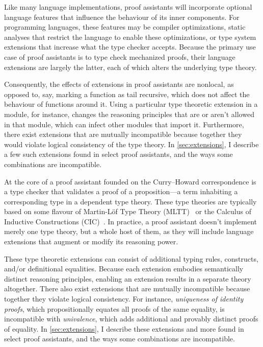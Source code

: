 \documentclass{article}
\begin{document}
Like many language implementations,
proof assistants will incorporate optional language features
that influence the behaviour of its inner components.
For programming languages, these features may be compiler optimizations,
static analyses that restrict the language to enable these optimizations,
or type system extensions that increase what the type checker accepts.
Because the primary use case of proof assistants is to type check mechanized proofs,
their language extensions are largely the latter,
each of which alters the underlying type theory.

Consequently, the effects of extensions in proof assistants are nonlocal,
as opposed to, say, marking a function as tail recursive,
which does not affect the behaviour of functions around it.
Using a particular type theoretic extension in a module, for instance,
changes the reasoning principles that are or aren't allowed in that module,
which can infect other modules that import it.
Furthermore, there exist extensions that are mutually incompatible
because together they would violate logical consistency of the type theory.
In \cref{sec:extensions},
I describe a few such extensions found in select proof assistants,
and the ways some combinations are incompatible.
\fi

At the core of a proof assistant founded on the Curry--Howard correspondence
is a type checker that validates a proof of a proposition---a term inhabiting
a corresponding type in a dependent type theory.
These type theories are typically based on some flavour of
Martin-L\"of Type Theory (MLTT)~\citep{mltt}
or the Calculus of Inductive Constructions (CIC)~\citep{cic}.
In practice, a proof assistant doesn't implement merely one type theory,
but a whole host of them, as they will include language extensions
that augment or modify its reasoning power.

These type theoretic extensions can consist of additional typing rules,
constructs, and/or definitional equalities.
Because each extension embodies semantically distinct reasoning principles,
enabling an extension results in a separate theory altogether.
There also exist extensions that are mutually incompatible
because together they violate logical consistency.
For instance, \emph{uniqueness of identity proofs},
which propositionally equates all proofs of the same equality,
is incompatible with \emph{univalence},
which adds additional and provably distinct proofs of equality.
In \cref{sec:extensions},
I describe these extensions and more found in select proof assistants,
and the ways some combinations are incompatible.
\end{document}
